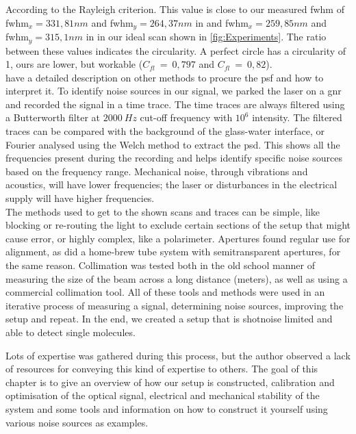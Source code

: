 	According to the Rayleigh criterion. This value is close to our measured \gls{fwhm} of \gls{fwhm}$_x = 331,81 nm$ and \gls{fwhm}$_y = 264,37 nm$ in \fl and \gls{fwhm}$_x = 259,85 nm$ and \gls{fwhm}$_y = 315,1 nm$ in \scat in our ideal scan shown in \cref{fig:Experiments}. The ratio between these values indicates the circularity. A perfect circle has a circularity of 1, ours are lower, but workable ($C_{fl}~=~0,797$ and  $C_{fl}~=~0,82$).\\ \cite{cole2011measuring} have a detailed description on other methods to procure the \gls{psf} and how to interpret it. To identify noise sources in our signal, we parked the laser on a \gls{gnr} and recorded the signal in a time trace. The time traces are always filtered using a Butterworth filter at $2000~Hz$ cut-off frequency with $10^6$ intensity. The filtered traces can be compared with the background of the glass-water interface, or Fourier analysed using the Welch method to extract the \gls{psd}. This shows all the frequencies present during the recording and helps identify specific noise sources based on the frequency range. Mechanical noise, through vibrations and acoustics, will have lower frequencies; the laser or disturbances in the electrical supply will have higher frequencies. \\ The methods used to get to the shown scans and traces can be simple, like blocking or re-routing the light to exclude certain sections of the setup that might cause error, or highly complex, like a polarimeter. Apertures found regular use for alignment, as did a home-brew tube system with semitransparent apertures, for the same reason. Collimation was tested both in the old school manner of measuring the size of the beam across a long distance (meters), as well as using a commercial collimation tool. All of these tools and methods were used in an iterative process of measuring a signal, determining noise sources, improving the setup and repeat. In the end, we created a setup that is \gls{shotnoise} limited and able to detect single molecules.
	
	Lots of expertise was gathered during this process, but the author observed a lack of resources for conveying this kind of expertise to others.
	The goal of this chapter is to give an overview of how our setup is constructed, calibration and optimisation of the optical signal, electrical and mechanical stability of the system and some tools and information on how to construct it yourself using various noise sources as examples.
\newpage
